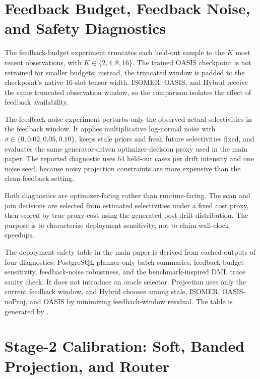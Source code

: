 \documentclass[11pt]{article}
\begin{document}
\section{Feedback Budget, Feedback Noise, and Safety Diagnostics}
\label{sec:feedback-sensitivity-app}

The feedback-budget experiment truncates each held-out sample to the $K$ most
recent observations, with $K\in\{2,4,8,16\}$. The trained OASIS checkpoint is
not retrained for smaller budgets; instead, the truncated window is padded to
the checkpoint's native 16-slot tensor width. ISOMER, OASIS, and Hybrid
receive the same truncated observation window, so the comparison isolates the
effect of feedback availability.

The feedback-noise experiment perturbs only the observed actual selectivities
in the feedback window. It applies multiplicative log-normal noise with
$\sigma\in\{0,0.02,0.05,0.10\}$, keeps stale priors and fresh future
selectivities fixed, and evaluates the same generator-driven
optimizer-decision proxy used in the main paper. The reported diagnostic uses
64 held-out cases per drift intensity and one noise seed, because noisy
projection constraints are more expensive than the clean-feedback setting.

Both diagnostics are optimizer-facing rather than runtime-facing. The scan and
join decisions are selected from estimated selectivities under a fixed cost
proxy, then scored by true proxy cost using the generated post-drift
distribution. The purpose is to characterize deployment sensitivity, not to
claim wall-clock speedups.

The deployment-safety table in the main paper is derived from cached outputs of
four diagnostics: PostgreSQL planner-only batch summaries, feedback-budget
sensitivity, feedback-noise robustness, and the benchmark-inspired DML trace
sanity check. It does not introduce an oracle selector. Projection uses only the
current feedback window, and Hybrid chooses among stale, ISOMER, OASIS-noProj,
and OASIS by minimizing feedback-window residual. The table is generated by
.

\section{Stage-2 Calibration: Soft, Banded Projection, and Router}
\label{sec:stage2-calibration-app}
\end{document}
